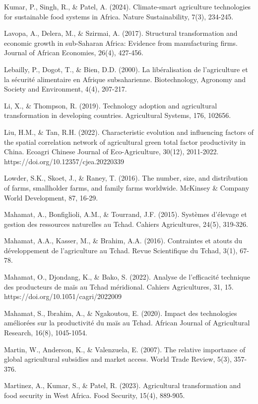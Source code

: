 \documentclass[12pt,oneside]{report}
\begin{document}
Kumar, P., Singh, R., \& Patel, A. (2024). Climate-smart agriculture technologies for sustainable food systems in Africa. Nature Sustainability, 7(3), 234-245.

Lavopa, A., Delera, M., \& Szirmai, A. (2017). Structural transformation and economic growth in sub-Saharan Africa: Evidence from manufacturing firms. Journal of African Economies, 26(4), 427-456.

Lebailly, P., Dogot, T., \& Bien, D.D. (2000). La libéralisation de l'agriculture et la sécurité alimentaire en Afrique subsaharienne. Biotechnology, Agronomy and Society and Environment, 4(4), 207-217.

Li, X., \& Thompson, R. (2019). Technology adoption and agricultural transformation in developing countries. Agricultural Systems, 176, 102656.

Liu, H.M., \& Tan, R.H. (2022). Characteristic evolution and influencing factors of the spatial correlation network of agricultural green total factor productivity in China. Ecoagri Chinese Journal of Eco-Agriculture, 30(12), 2011-2022. https://doi.org/10.12357/cjea.20220339

Lowder, S.K., Skoet, J., \& Raney, T. (2016). The number, size, and distribution of farms, smallholder farms, and family farms worldwide. McKinsey \& Company World Development, 87, 16-29.

Mahamat, A., Bonfiglioli, A.M., \& Tourrand, J.F. (2015). Systèmes d'élevage et gestion des ressources naturelles au Tchad. Cahiers Agricultures, 24(5), 319-326.

Mahamat, A.A., Kasser, M., \& Brahim, A.A. (2016). Contraintes et atouts du développement de l'agriculture au Tchad. Revue Scientifique du Tchad, 3(1), 67-78.

Mahamat, O., Djondang, K., \& Bako, S. (2022). Analyse de l'efficacité technique des producteurs de maïs au Tchad méridional. Cahiers Agricultures, 31, 15. https://doi.org/10.1051/cagri/2022009

Mahamat, S., Ibrahim, A., \& Ngakoutou, E. (2020). Impact des technologies améliorées sur la productivité du maïs au Tchad. African Journal of Agricultural Research, 16(8), 1045-1054.

Martin, W., Anderson, K., \& Valenzuela, E. (2007). The relative importance of global agricultural subsidies and market access. World Trade Review, 5(3), 357-376.

Martinez, A., Kumar, S., \& Patel, R. (2023). Agricultural transformation and food security in West Africa. Food Security, 15(4), 889-905.
\end{document}
